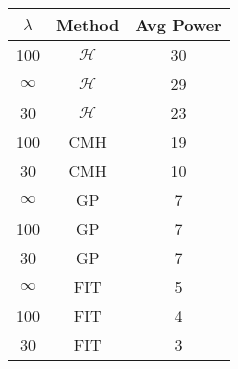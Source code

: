 \centering \begin{tabular}{c|c|c}
$\lambda$	&Method	&Avg Power\\\hline
100	&$\mathcal{H}$	&30\\
$\infty$	&$\mathcal{H}$	&29\\
30	&$\mathcal{H}$	&23\\
100	&CMH	&19\\
30	&CMH	&10\\
$\infty$	&GP	&7\\
100	&GP	&7\\
30	&GP	&7\\
$\infty$	&FIT	&5\\
100	&FIT	&4\\
30	&FIT	&3\\
\end{tabular}
